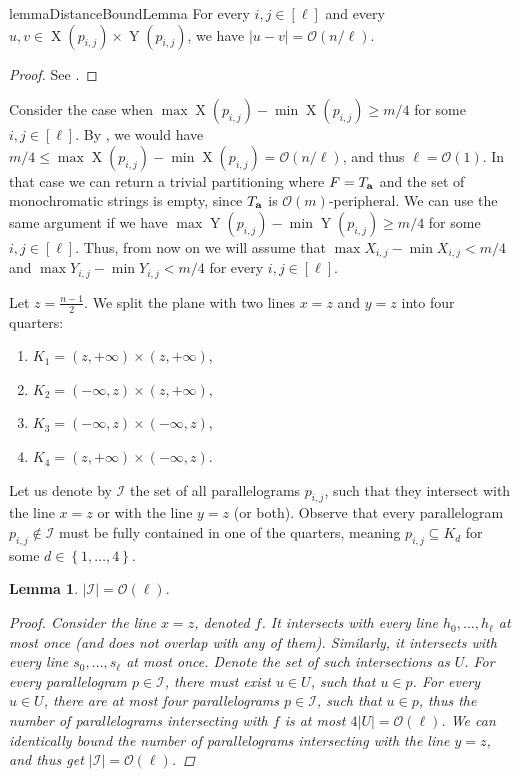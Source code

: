 \documentclass[11pt]{article}
\renewcommand{\O}{\mathcal{O}}
\newcommand{\set}[1]{\left\lbrace #1 \right\rbrace}
\theoremstyle{plain}
\newtheorem{lemma}{Lemma}
\theoremstyle{definition}
\theoremstyle{remark}
\DeclareMathOperator*{\X}{X}
\DeclareMathOperator*{\Y}{Y}
\begin{document}
\begin{restatable*}{lemma}{DistanceBoundLemma}\label{distance_bound_lemma}
	For every $i, j \in [\ell]$ and every $u, v \in \X(p_{i, j}) \times \Y(p_{i, j})$, we have $|u - v| = \O(n / \ell)$.
\end{restatable*}
\begin{proof} See . \end{proof}

Consider the case when $\max \X(p_{i, j}) - \min \X(p_{i, j}) \ge m / 4$ for some $i, j \in [\ell]$.
By , we would have $m / 4 \le \max \X(p_{i, j}) - \min \X(p_{i, j}) = \O(n / \ell)$, and thus $\ell = \O(1)$.
In that case we can return a trivial partitioning where $F = T_\mathbf{a}$ and the set of monochromatic strings is empty, since $T_\mathbf{a}$ is $\O(m)$-peripheral.
We can use the same argument if we have $\max \Y(p_{i, j}) - \min \Y(p_{i, j}) \ge m / 4$ for some $i, j \in [\ell]$.
Thus, from now on we will assume that $\max X_{i, j} - \min X_{i, j} < m / 4$ and $\max Y_{i, j} - \min Y_{i, j} < m / 4$ for every $i, j \in [\ell]$. 

Let $z = \frac{n - 1}{2}$. 
We split the plane with two lines $x = z$ and $y = z$ into four quarters:
\begin{enumerate}[1)]
	\item $K_1 = (z, +\infty) \times (z, +\infty)$,
	\item $K_2 = (-\infty, z) \times (z, +\infty)$,
	\item $K_3 = (-\infty, z) \times (-\infty, z)$,
	\item $K_4 = (z, +\infty) \times (-\infty, z)$.
\end{enumerate}
\newcommand{\I}{\mathcal{I}}
\newcommand{\G}{\mathcal{G}}
\newcommand{\C}{\mathcal{C}}
Let us denote by $\I$ the set of all parallelograms $p_{i, j}$, such that they intersect with the line $x = z$ or with the line $y = z$ (or both).
Observe that every parallelogram $p_{i, j} \not \in \I$ must be fully contained in one of the quarters, meaning $p_{i, j} \subseteq K_d$ for some $d \in \set{1, \dots, 4}$.

\begin{lemma}\label{I_size_bound}
	$|\I| = \O(\ell).$
	\begin{proof}
		Consider the line $x = z$, denoted $f$.
		It intersects with every line $h_0, \dots, h_\ell$ at most once (and does not overlap with any of them).
		Similarly, it intersects with every line $s_0, \dots, s_\ell$ at most once.
		Denote the set of such intersections as $U$.
		For every parallelogram $p \in \I$, there must exist $u \in U$, such that $u \in p$.
		For every $u \in U$, there are at most four parallelograms $p \in \I$, such that $u \in p$,
		thus the number of parallelograms intersecting with $f$ is at most $4|U| = \O(\ell)$.
		We can identically bound the number of parallelograms intersecting with the line $y = z$, and thus get $|\I| = \O(\ell)$.
	\end{proof}
\end{lemma}
\end{document}
